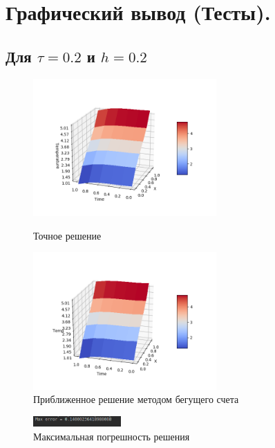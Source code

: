 \documentclass[12pt,a4paper]{scrartcl}
\begin{document}
	\section{Графический вывод (Тесты).}
	\subsection{Для $\tau = 0.2$ и $h = 0.2$}
	\begin{figure}[h]
		\begin{multicols}{2}
			\hfill
			\includegraphics[width=70mm]{mainFunc5-5.png}
			\hfill
			\caption{Точное решение}
			\hfill
			\includegraphics[width=70mm]{result5-5.png}
			\hfill
			\caption{Приближенное решение методом бегущего счета}
		\end{multicols}
	\end{figure}

	\begin{figure}[h]
		\centering
		\includegraphics[width=0.3\textwidth]{MaxError5-5.png}
		\caption{Максимальная погрешность решения}
	\end{figure}
\end{document}
